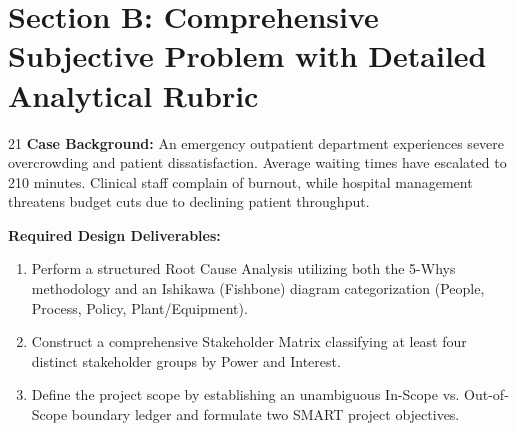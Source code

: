 \newpage
\section{Section B: Comprehensive Subjective Problem with Detailed Analytical Rubric}

\begin{subjectiveq}{2}{1}
\textbf{Case Background:} An emergency outpatient department experiences severe overcrowding and patient dissatisfaction. Average waiting times have escalated to 210 minutes. Clinical staff complain of burnout, while hospital management threatens budget cuts due to declining patient throughput.

\textbf{Required Design Deliverables:}
\begin{enumerate}[label=(\alph*)]
    \item Perform a structured Root Cause Analysis utilizing both the 5-Whys methodology and an Ishikawa (Fishbone) diagram categorization (People, Process, Policy, Plant/Equipment).
    \item Construct a comprehensive Stakeholder Matrix classifying at least four distinct stakeholder groups by Power and Interest.
    \item Define the project scope by establishing an unambiguous In-Scope vs. Out-of-Scope boundary ledger and formulate two SMART project objectives.
\end{enumerate}
\end{subjectiveq}

